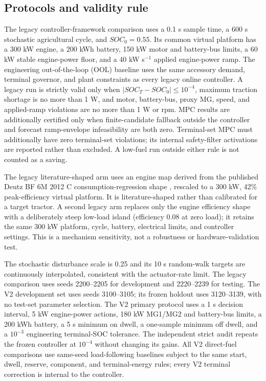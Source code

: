 \documentclass[energies,article,submit,moreauthors]{Definitions/mdpi}
\begin{document}
\subsection{Protocols and validity rule}
The legacy controller-framework comparison uses a 0.1 s sample time, a 600 s stochastic agricultural cycle, and $SOC_0=0.55$. Its common virtual platform has a 300 kW engine, a 200 kWh battery, 150 kW motor and battery-bus limits, a 60 kW stable engine-power floor, and a 40 kW s$^{-1}$ applied engine-power ramp. The engineering out-of-the-loop (OOL) baseline uses the same accessory demand, terminal governor, and plant constraints as every legacy online controller. A legacy run is strictly valid only when $|SOC_T-SOC_0|\le10^{-4}$, maximum traction shortage is no more than 1 W, and motor, battery-bus, proxy MG, speed, and applied-ramp violations are no more than 1 W or rpm. MPC results are additionally certified only when finite-candidate fallback outside the controller and forecast ramp-envelope infeasibility are both zero. Terminal-set MPC must additionally have zero terminal-set violations; its internal safety-filter activations are reported rather than excluded. A low-fuel run outside either rule is not counted as a saving.

The legacy literature-shaped arm uses an engine map derived from the published Deutz BF 6M 2012 C consumption-regression shape \cite{devyanin2023}, rescaled to a 300 kW, 42\% peak-efficiency virtual platform. It is literature-shaped rather than calibrated for a target tractor. A second legacy arm replaces only the engine efficiency shape with a deliberately steep low-load island (efficiency 0.08 at zero load); it retains the same 300 kW platform, cycle, battery, electrical limits, and controller settings. This is a mechanism sensitivity, not a robustness or hardware-validation test.

The stochastic disturbance scale is 0.25 and its 10 s random-walk targets are continuously interpolated, consistent with the actuator-rate limit. The legacy comparison uses seeds 2200--2205 for development and 2220--2239 for testing. The V2 development set uses seeds 3100--3105; its frozen holdout uses 3120--3139, with no test-set parameter selection. The V2 primary protocol uses a 1 s decision interval, 5 kW engine-power actions, 180 kW MG1/MG2 and battery-bus limits, a 200 kWh battery, a 5 s minimum on dwell, a one-sample minimum off dwell, and a $10^{-3}$ engineering terminal-SOC tolerance. The independent strict audit repeats the frozen controller at $10^{-4}$ without changing its gains. All V2 direct-fuel comparisons use same-seed load-following baselines subject to the same start, dwell, reserve, component, and terminal-energy rules; every V2 terminal correction is internal to the controller.
\end{document}
